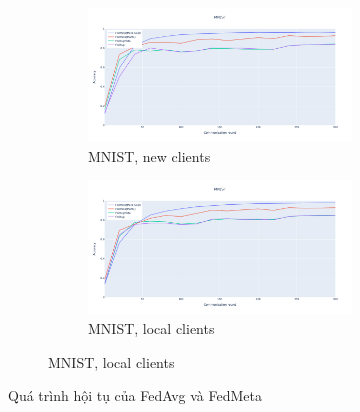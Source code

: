 \begin{figure}
    \begin{subfigure}{\textwidth}
        \centering
        \begin{subfigure}{.5\textwidth}
            \centering
            \includegraphics[width=\linewidth]{./images/mnist_meta_new.png}
            \caption{MNIST, new clients}
            \label{fig:mnist_meta_new}
        \end{subfigure}%
        \begin{subfigure}{.5\textwidth}
            \centering
            \includegraphics[width=\linewidth]{./images/mnist_meta_old.png}
            \caption{MNIST, local clients}
            \label{fig:mnist_meta_old}
        \end{subfigure}
    \end{subfigure}
    \caption{Quá trình hội tụ của FedAvg và FedMeta}
    \label{fig:fedmeta_acc}
\end{figure}

